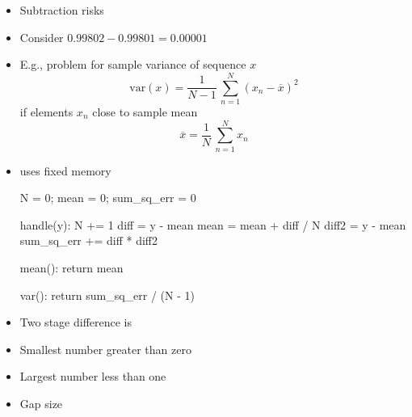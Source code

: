 \documentclass[10pt]{report}
\begin{document}
%
\begin{itemize}
\item Subtraction risks 
\item Consider $0.99802 - 0.99801 = 0.00001$
\item E.g., problem for sample variance of sequence $x$
\[
\mbox{var}(x) = \frac{1}{N - 1} \, \sum_{n = 1}^N (x_n - \overline{x})^2
\]
if elements $x_n$ close to sample mean
\[
\overline{x} = \frac{1}{N} \, \sum_{n=1}^N x_n
\]
\end{itemize}

\begin{itemize}
\item {} uses fixed memory
\begin{stancode}
N = 0;    mean = 0;    sum_sq_err = 0

handle(y):
    N += 1
    diff = y - mean
    mean = mean + diff / N
    diff2 = y - mean
    sum_sq_err += diff * diff2

mean():  return mean

var():  return sum_sq_err / (N - 1)
\end{stancode}
\item Two stage difference is 
\end{itemize}


%
\begin{itemize}
\item Smallest number greater than zero
\item Largest number less than one
\item Gap size 
\end{itemize}
\end{document}
